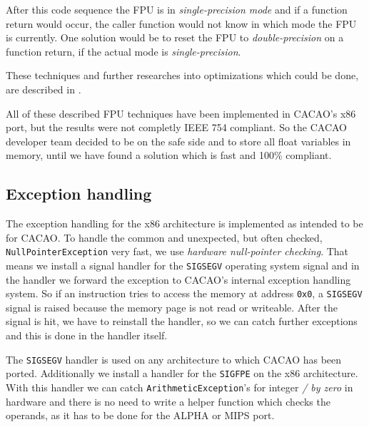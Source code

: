 \begin{itemize}
 After this code sequence the FPU is in \textit{single-precision mode}
 and if a function return would occur, the caller function would not
 know in which mode the FPU is currently. One solution would be to
 reset the FPU to \textit{double-precision} on a function return, if
 the actual mode is \textit{single-precision}.
\end{itemize}

These techniques and further researches into optimizations which could
be done, are described in \cite{OgKoNa02}.

All of these described FPU techniques have been implemented in CACAO's
x86 port, but the results were not completly IEEE 754 compliant. So
the CACAO developer team decided to be on the safe side and to store
all float variables in memory, until we have found a solution which is
fast and 100\% compliant.


\subsection{Exception handling}

The exception handling for the x86 architecture is implemented as
intended to be for CACAO. To handle the common and unexpected, but
often checked, \texttt{NullPointerException} very fast, we use
\textit{hardware null-pointer checking}. That means we install a
signal handler for the \texttt{SIGSEGV} operating system signal and in
the handler we forward the exception to CACAO's internal exception
handling system. So if an instruction tries to access the memory at
address \texttt{0x0}, a \texttt{SIGSEGV} signal is raised because the
memory page is not read or writeable. After the signal is hit, we have
to reinstall the handler, so we can catch further exceptions and this
is done in the handler itself.

The \texttt{SIGSEGV} handler is used on any architecture to which
CACAO has been ported. Additionally we install a handler for the
\texttt{SIGFPE} on the x86 architecture. With this handler we can
catch \texttt{ArithmeticException}'s for integer \textit{/ by zero} in
hardware and there is no need to write a helper function which checks
the operands, as it has to be done for the ALPHA or MIPS port.
